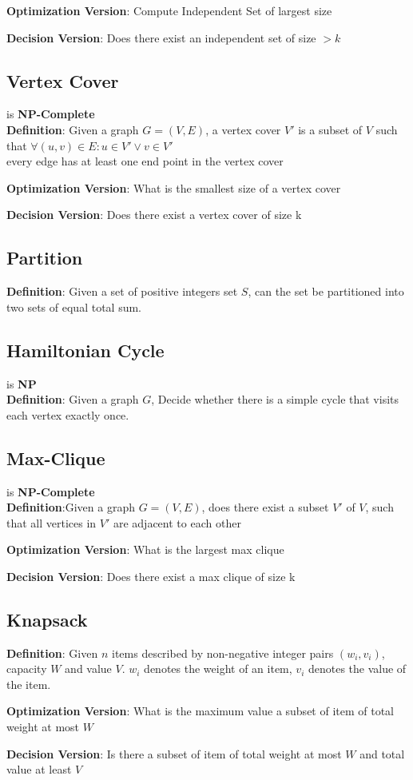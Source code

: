 \documentclass{article}
\begin{document}
\begin{multicols*}{4}
\textbf{Optimization Version}: Compute Independent Set of largest size

\textbf{Decision Version}: Does there exist an independent set of size $>k$

\subsection{Vertex Cover}
is \textbf{NP-Complete}\\
\textbf{Definition}: Given a graph $G=(V,E)$, a vertex cover $V'$ is a subset of $V$ such that $\forall (u,v)\in E: u\in V' \vee v\in V'$\\
every edge has at least one end point in the vertex cover

\textbf{Optimization Version}: What is the smallest size of a vertex cover

\textbf{Decision Version}: Does there exist a vertex cover of size k

\subsection{Partition}
\textbf{Definition}: Given a set of positive integers set $S$, can the set be partitioned into two sets of equal total sum.

\subsection{Hamiltonian Cycle}
is \textbf{NP}\\
\textbf{Definition}: Given a graph $G$, Decide whether there is a simple cycle that visits each vertex exactly once.\\ 

\subsection{Max-Clique}
is \textbf{NP-Complete}\\
\textbf{Definition}:Given a graph $G=(V,E)$, does there exist a subset $V'$ of $V$, such that all vertices in $V'$ are adjacent to each other

\textbf{Optimization Version}: What is the largest max clique

\textbf{Decision Version}: Does there exist a max clique of size k

\subsection{Knapsack}
\textbf{Definition}: Given $n$ items described by non-negative integer pairs $(w_i,v_i)$, capacity $W$ and value $V$. $w_i$ denotes the weight of an item, $v_i$ denotes the value of the item.

\textbf{Optimization Version}: What is the maximum value a subset of item of total weight at most $W$ 

\textbf{Decision Version}: Is there a subset of item of total weight at most $W$ and total value at least $V$



\end{multicols*}
\end{document}
